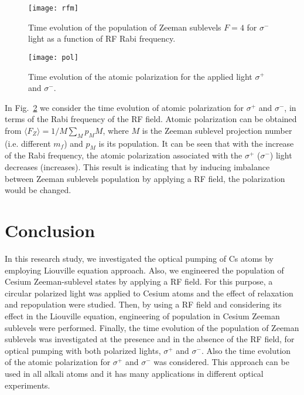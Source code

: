 \documentclass[a4paper]{article}
\begin{document}
\begin{figure}[h!]
\centering
\texttt{[image: rfm]}
\caption{Time evolution of the population of Zeeman sublevels $F=4$ for $\sigma^-$ light as a function of RF Rabi frequency.}\label{f9}
\end{figure}
\begin{figure}[h!]
\centering
\texttt{[image: pol]}
\caption{Time evolution of the atomic polarization for the applied light $\sigma^+$ and $\sigma^-$.}\label{f10}
\end{figure}
\newpage
In Fig.~\ref{f10} we consider the time evolution of atomic polarization for $\sigma^+$ and $\sigma^-$, in terms of the Rabi frequency of the RF field. Atomic polarization can be obtained from $\langle F_Z\rangle=1/M \sum_M p_M M$, where $M$ is the Zeeman sublevel projection number (i.e. different $ m_f$) and $p_M$ is its population. It can be seen that with the increase of the Rabi frequency, the atomic polarization associated with the $\sigma^+$ ($\sigma^-$) light decreases (increases). This result is indicating that by inducing imbalance between Zeeman sublevels population by applying a RF field, the polarization would be changed.


\newpage
\section{Conclusion}\label{sec4}
In this research study, we investigated the optical pumping of Cs atoms by employing Liouville equation approach. Also, we engineered the population of Cesium Zeeman-sublevel states by applying a RF field. For this purpose, a circular polarized light was applied to Cesium atoms and the effect of relaxation and repopulation were studied. Then, by using a RF field and considering its effect in the Liouville equation, engineering of population in Cesium Zeeman sublevels were performed. Finally, the time evolution of the population of Zeeman sublevels was investigated at the presence and in the absence of the RF field, for optical pumping with both polarized lights, $\sigma^+$ and $\sigma^-$. Also the time evolution of the atomic polarization for $\sigma^+$  and $\sigma^-$ was considered. This approach can be used in all alkali atoms and it has many applications in different optical experiments.




\end{document}
